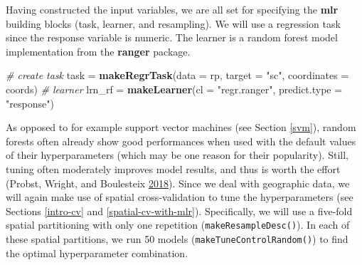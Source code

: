 \documentclass[]{krantz}
\newenvironment{Shaded}{\begin{snugshade}}{\end{snugshade}}
\newcommand{\CommentTok}[1]{\textcolor[rgb]{0.37,0.37,0.37}{\textit{#1}}}
\newcommand{\DataTypeTok}[1]{\textcolor[rgb]{0.27,0.27,0.27}{#1}}
\newcommand{\KeywordTok}[1]{\textcolor[rgb]{0.27,0.27,0.27}{\textbf{#1}}}
\newcommand{\NormalTok}[1]{#1}
\newcommand{\OperatorTok}[1]{\textcolor[rgb]{0.43,0.43,0.43}{\textbf{#1}}}
\newcommand{\StringTok}[1]{\textcolor[rgb]{0.5,0.5,0.5}{#1}}
\begin{document}
\begin{Shaded}
\end{Shaded}

Having constructed the input variables, we are all set for specifying the \textbf{mlr} building blocks (task, learner, and resampling).
We will use a regression task since the response variable is numeric.
The learner is a random forest model implementation from the \textbf{ranger} package.

\begin{Shaded}
\begin{Highlighting}[]
\CommentTok{# create task}
\NormalTok{task =}\StringTok{ }\KeywordTok{makeRegrTask}\NormalTok{(}\DataTypeTok{data =}\NormalTok{ rp, }\DataTypeTok{target =} \StringTok{"sc"}\NormalTok{, }\DataTypeTok{coordinates =}\NormalTok{ coords)}
\CommentTok{# learner}
\NormalTok{lrn_rf =}\StringTok{ }\KeywordTok{makeLearner}\NormalTok{(}\DataTypeTok{cl =} \StringTok{"regr.ranger"}\NormalTok{, }\DataTypeTok{predict.type =} \StringTok{"response"}\NormalTok{)}
\end{Highlighting}
\end{Shaded}

As opposed to for example support vector machines (see Section \ref{svm}), random forests often already show good performances when used with the default values of their hyperparameters (which may be one reason for their popularity).
Still, tuning often moderately improves model results, and thus is worth the effort (Probst, Wright, and Boulesteix \protect\hyperlink{ref-probst_hyperparameters_2018}{2018}).
Since we deal with geographic data, we will again make use of spatial cross-validation to tune the hyperparameters (see Sections \ref{intro-cv} and \ref{spatial-cv-with-mlr}).
Specifically, we will use a five-fold spatial partitioning with only one repetition (\texttt{makeResampleDesc()}).
In each of these spatial partitions, we run 50 models (\texttt{makeTuneControlRandom()}) to find the optimal hyperparameter combination.
\end{document}
